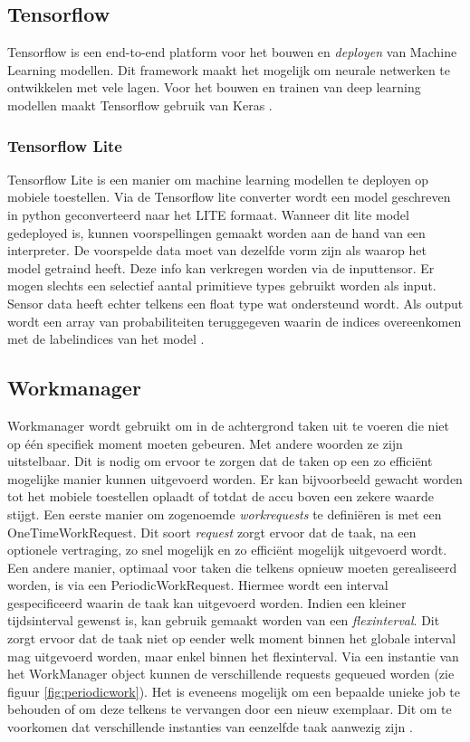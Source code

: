 \subsection{Tensorflow}
Tensorflow is een end-to-end platform voor het bouwen en \textit{deployen} van Machine Learning modellen. Dit framework maakt het mogelijk om neurale netwerken te ontwikkelen met vele lagen. Voor het bouwen en trainen van deep learning modellen maakt Tensorflow gebruik van Keras \cite{ref62}.

\subsubsection{Tensorflow Lite}

Tensorflow Lite is een manier om machine learning modellen te deployen op mobiele toestellen. Via de Tensorflow lite converter wordt een model geschreven in python geconverteerd naar het LITE formaat. Wanneer dit lite model gedeployed is, kunnen voorspellingen gemaakt worden aan de hand van een interpreter. De voorspelde data moet van dezelfde vorm zijn als waarop het model getraind heeft. Deze info kan verkregen worden via de inputtensor. Er mogen slechts een selectief aantal primitieve types gebruikt worden als input. Sensor data heeft echter telkens een float type wat ondersteund wordt. 
Als output wordt een array van probabiliteiten teruggegeven waarin de indices overeenkomen met de labelindices van het model \cite{ref63}.

\subsection{Workmanager} \label{subsection:workmanager}
Workmanager wordt gebruikt om in de achtergrond taken uit te voeren die niet op één specifiek moment moeten gebeuren. Met andere woorden ze zijn uitstelbaar. Dit is nodig om ervoor te zorgen dat de taken op een zo efficiënt mogelijke manier kunnen uitgevoerd worden. Er kan bijvoorbeeld gewacht worden tot het mobiele toestellen oplaadt of totdat de accu boven een zekere waarde stijgt. Een eerste manier om zogenoemde \textit{workrequests} te definiëren is met een OneTimeWorkRequest. Dit soort \textit{request} zorgt ervoor dat de taak, na een optionele vertraging, zo snel mogelijk en zo efficiënt mogelijk uitgevoerd wordt. Een andere manier, optimaal voor taken die telkens opnieuw moeten gerealiseerd worden, is via een PeriodicWorkRequest. Hiermee wordt een interval gespecificeerd waarin de taak kan uitgevoerd worden. Indien een kleiner tijdsinterval gewenst is, kan gebruik gemaakt worden van een \textit{flexinterval}. Dit zorgt ervoor dat de taak niet op eender welk moment binnen het globale interval mag uitgevoerd worden, maar enkel binnen het flexinterval. Via een instantie van het WorkManager object kunnen de verschillende requests gequeued worden (zie figuur \ref{fig:periodicwork}). Het is eveneens mogelijk om een bepaalde unieke job te behouden of om deze telkens te vervangen door een nieuw exemplaar. Dit om te voorkomen dat verschillende instanties van eenzelfde taak aanwezig zijn \cite{ref64}.

